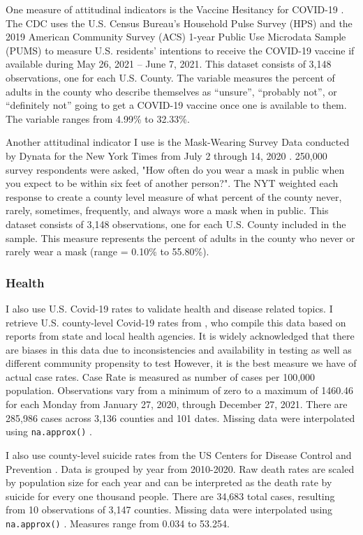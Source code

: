 One measure of attitudinal indicators is the Vaccine Hesitancy for COVID-19
\citep{vaches_data}. The CDC uses the U.S. Census Bureau’s Household Pulse Survey
(HPS) and the 2019 American Community Survey (ACS) 1-year Public Use Microdata
Sample (PUMS) to measure U.S. residents’ intentions to receive the COVID-19
vaccine if available during May 26, 2021 – June 7, 2021. This dataset consists
of 3,148 observations, one for each U.S. County. The variable
measures the percent of adults in the county who describe themselves as
“unsure”, “probably not”, or “definitely not” going to get a COVID-19 vaccine
once one is available to them. The variable ranges from 4.99\% to 32.33\%. 

Another attitudinal indicator I use is the Mask-Wearing Survey Data conducted by
Dynata for the New York Times from July 2 through 14, 2020 \citep{mask_data}. 250,000
survey respondents were asked, "How often do you wear a mask in public when you
expect to be within six feet of another person?". The NYT weighted each response
to create a county level measure of what percent of the county never, rarely,
sometimes, frequently, and always wore a mask when in public. This dataset
consists of 3,148 observations, one for each U.S. County included in the sample. This measure
represents the percent of adults in the county who never or rarely wear a mask
(range = 0.10\% to 55.80\%).

\subsubsection{Health}

I also use U.S. Covid-19 rates to validate health and disease related topics. I
retrieve U.S. county-level Covid-19 rates from \citet{covid_data}, who compile this
data based on reports from state and local health agencies. It is widely
acknowledged that there are biases in this data due to inconsistencies and
availability in testing as well as different community propensity to test
\citep{gu22, cdc20a} However, it is the best measure we have of actual case rates.
Case Rate is measured as number of cases per 100,000 population. Observations
vary from a minimum of zero to a maximum of 1460.46 for each Monday from January 27, 2020, through
December 27, 2021. There are 285,986 cases across 3,136 counties and 101
dates. Missing data were interpolated using \texttt{na.approx()} \citep{zoo}.

I also use county-level suicide rates from the US Centers for Disease Control
and Prevention \citeyearpar{suic_data}. Data is grouped by year from 2010-2020. Raw death
rates are scaled by population size for each year and can be interpreted as the
death rate by suicide for every one thousand people. There are 34,683 total
cases, resulting from 10 observations of 3,147 counties. Missing data were interpolated using
\texttt{na.approx()} \citep{zoo}. Measures range from 0.034 to 53.254.

